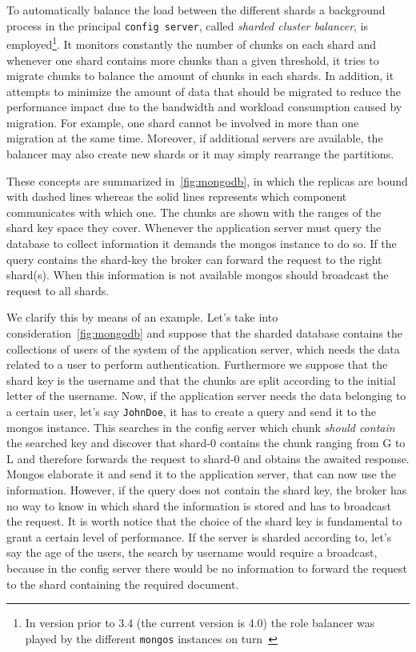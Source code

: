 To automatically balance the load between the different shards a background 
process in the principal \texttt{config server}, called \emph{sharded cluster 
balancer}, 
is employed\footnote{In version prior to 3.4 (the current version is 4.0) the
role balancer was played by the different \texttt{mongos} 
instances on turn~\cite{bib:mongodb-docs}}. It monitors constantly the number
of chunks on each shard and  whenever one  shard contains more chunks than a 
given threshold, it tries to migrate chunks to balance the amount of chunks
in each shards. In addition, it attempts to minimize the amount of data 
that should be migrated to reduce the performance impact due to the bandwidth 
and workload consumption caused by migration. For example, one shard cannot be 
involved in more than one migration at the same time. Moreover, if additional 
servers are available, the balancer may also create new shards or it may simply 
rearrange the partitions.

These concepts are summarized in~\autoref{fig:mongodb}, in which the replicas
are bound with dashed lines whereas the solid lines represents which
component communicates with which one. The chunks are shown with the
ranges of the shard key space they cover.
Whenever the application server must query the database to collect information
it demands the mongos instance to do so. If the query contains the shard-key
the broker can forward the request to the right shard(s). When this information
is not available mongos should broadcast the request to all shards.

We clarify this by means of an example. Let's take into 
consideration~\autoref{fig:mongodb} and suppose that the sharded database
contains the collections of users of the system of the application server,
which needs the data related to a user to perform authentication.
Furthermore we suppose that the shard key is the username and that the chunks
are split according to the initial letter of the username. Now, if the 
application server needs the data belonging to a certain user, let's say 
\texttt{JohnDoe}, it has to create a query and send it to the mongos instance. 
This searches in the config server which chunk \emph{should contain} the
searched key and discover that shard-0 contains the chunk ranging from G to L 
and therefore forwards the request to shard-0 and obtains the awaited response.
Mongos elaborate it and send it to the application server, that can now use
the information. However, if the query does not contain the shard key, the 
broker has no way to know in which shard the information is stored and has to
broadcast the request.
It is worth notice that the choice of the shard key is fundamental to grant a 
certain level of performance. If the server is sharded according to, let's say 
the age of the users, the search by username would require a broadcast, because
in the config server there would be no information to forward the request to 
the shard containing the required document.



